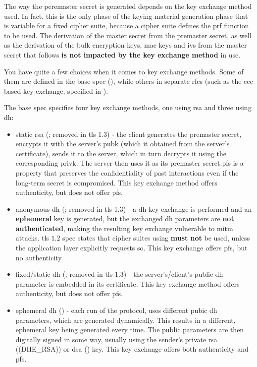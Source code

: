 \documentclass{llncs}
\begin{document}
The way the peremaster secret is generated depends on the key exchange
method used. In fact, this is the only phase of the keying material generation
phase that is variable for a fixed cipher suite, because a cipher suite defines
the \gls{prf} function to be used. The derivation
of the master secret from the premaster secret, as well as the
derivation of the bulk encryption keys, \gls{mac} keys and \gls{iv}s from the master secret
that follows \textbf{is not impacted by the key exchange method} in use.

You have quite a few choices when it comes to key exchange methods. Some of them
are defined in the base spec (\cite{RFC5246}), while others
in separate \gls{rfc}s (such as the \gls{ecc} based key exchange, specified
in  \cite{RFC4492}).

The base spec specifies four key exchange methods, one using \gls{rsa} and
three using \gls{dh}:

\begin{itemize}
  \item static \gls{rsa} (; removed in \gls{tls} 1.3) - the client generates the premaster secret, encrypts it with the
  server's \gls{pubk} (which it obtained from the server's  certificate),
  sends it to the server, which in turn decrypts it using the corresponding \gls{privk}. The server then uses it as its premaster secret.\gls{pfs} is
  a property that preserves the confidentiality of past interactions even if the
  long-term secret is compromised. This key exchange method offers authenticity, but does not offer \gls{pfs}.
  \item anonymous \gls{dh} (; removed in \gls{tls} 1.3) - a \gls{dh} key exchange is
  performed and an \textbf{ephemeral} key is generated, but the exchanged \gls{dh}
  parameters are \textbf{not authenticated}, making the resulting key exchange
  vulnerable to \gls{mitm} attacks. \gls{tls} $1.2$ spec states that cipher suites
  using  \textbf{must not} be used, unless the application
  layer explicitly requests so. This key exchange offers \gls{pfs}, but no
  authenticity.
  \item fixed/static \gls{dh} (; removed in \gls{tls} 1.3) - the server's/client's public \gls{dh} parameter
  is embedded in its certificate. This key exchange method offers authenticity,
  but does not offer \gls{pfs}.
  \item ephemeral \gls{dh} () - each run of the protocol, uses
  different pubic \gls{dh} parameters, which are generated dynamically. This results
  in a different, ephemeral key being generated every time. The public parameters
  are then digitally signed in some way, usually using the sender's private
  \gls{rsa} (\codeword(DHE_RSA)) or \gls{dsa} () key. This key
  exchange offers both authenticity and \gls{pfs}.
\end{itemize}
\end{document}
